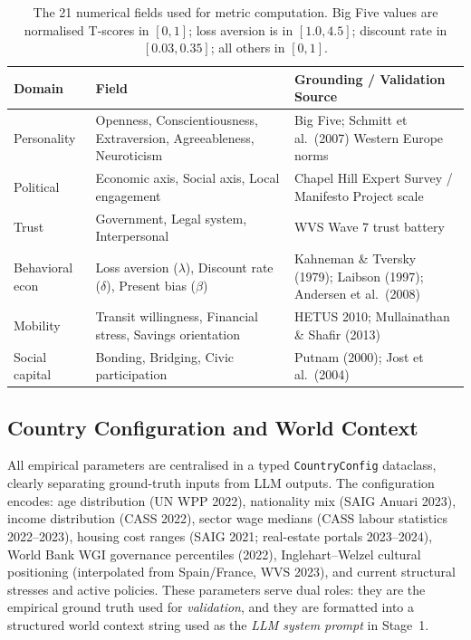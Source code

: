 \documentclass[a4paper,12pt]{article}
\begin{document}
\begin{table}[H]
\caption{The 21 numerical fields used for metric computation.
Big Five values are normalised T-scores in $[0,1]$; loss aversion is
in $[1.0, 4.5]$; discount rate in $[0.03, 0.35]$; all others in $[0,1]$.}
\label{tab:schema_fields}
\begin{tabularx}{\textwidth}{p{3.2cm}p{4.5cm}X}
\toprule
\textbf{Domain} & \textbf{Field} & \textbf{Grounding / Validation Source} \\
\midrule
Personality     & Openness, Conscientiousness, Extraversion, Agreeableness, Neuroticism
                & Big Five; Schmitt et al.\ (2007) Western Europe norms \\
Political       & Economic axis, Social axis, Local engagement
                & Chapel Hill Expert Survey / Manifesto Project scale \\
Trust           & Government, Legal system, Interpersonal
                & WVS Wave 7 trust battery \\
Behavioral econ & Loss aversion ($\lambda$), Discount rate ($\delta$), Present bias ($\beta$)
                & Kahneman \& Tversky (1979); Laibson (1997); Andersen et al.\ (2008) \\
Mobility        & Transit willingness, Financial stress, Savings orientation
                & HETUS 2010; Mullainathan \& Shafir (2013) \\
Social capital  & Bonding, Bridging, Civic participation
                & Putnam (2000); Jost et al.\ (2004) \\
\bottomrule
\end{tabularx}
\end{table}

\subsection{Country Configuration and World Context}
\label{subsec:world_context}

All empirical parameters are centralised in a typed \texttt{CountryConfig}
dataclass, clearly separating ground-truth inputs from LLM outputs. The
configuration encodes: age distribution (UN WPP 2022), nationality mix
(SAIG Anuari 2023), income distribution (CASS 2022), sector wage medians
(CASS labour statistics 2022--2023), housing cost ranges (SAIG 2021;
real-estate portals 2023--2024), World Bank WGI governance percentiles (2022),
Inglehart--Welzel cultural positioning (interpolated from Spain/France, WVS
2023), and current structural stresses and active policies. These parameters
serve dual roles: they are the empirical ground truth used for
\emph{validation}, and they are formatted into a structured world context
string used as the \emph{LLM system prompt} in Stage~1.
\end{document}
